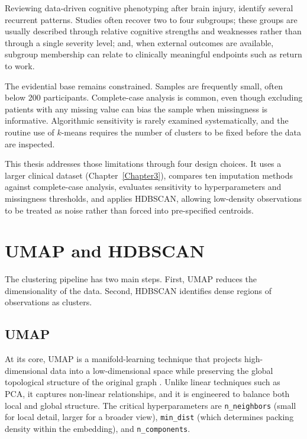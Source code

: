 Reviewing data-driven cognitive phenotyping after brain injury, \textcite{garcia2020data} identify several recurrent patterns. Studies often recover two to four subgroups; these groups are usually described through relative cognitive strengths and weaknesses rather than through a single severity level; and, when external outcomes are available, subgroup membership can relate to clinically meaningful endpoints such as return to work.

The evidential base remains constrained. Samples are frequently small, often below 200 participants. Complete-case analysis is common, even though excluding patients with any missing value can bias the sample when missingness is informative. Algorithmic sensitivity is rarely examined systematically, and the routine use of $k$-means requires the number of clusters to be fixed before the data are inspected.

This thesis addresses those limitations through four design choices. It uses a larger clinical dataset (Chapter~\ref{Chapter3}), compares ten imputation methods against complete-case analysis, evaluates sensitivity to hyperparameters and missingness thresholds, and applies HDBSCAN, allowing low-density observations to be treated as noise rather than forced into pre-specified centroids.


\section{UMAP and HDBSCAN}

The clustering pipeline has two main steps. First, UMAP reduces the dimensionality of the data. Second, HDBSCAN identifies dense regions of observations as clusters.

\subsection{UMAP}

At its core, UMAP is a manifold-learning technique that projects high-dimensional data into a low-dimensional space while preserving the global topological structure of the original graph \parencite{mcinnes2018umap}. Unlike linear techniques such as PCA, it captures non-linear relationships, and it is engineered to balance both local and global structure. The critical hyperparameters are \texttt{n\_neighbors} (small for local detail, larger for a broader view), \texttt{min\_dist} (which determines packing density within the embedding), and \texttt{n\_components}.

